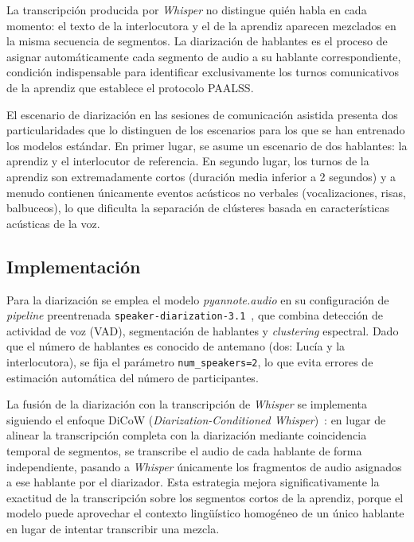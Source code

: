La transcripción producida por \emph{Whisper} no distingue quién habla en cada
momento: el texto de la interlocutora y el de la aprendiz aparecen mezclados en la
misma secuencia de segmentos. La diarización de hablantes es el proceso de asignar
automáticamente cada segmento de audio a su hablante correspondiente, condición
indispensable para identificar exclusivamente los turnos comunicativos de la aprendiz
que establece el protocolo \ac{PAALSS}.

El escenario de diarización en las sesiones de comunicación asistida presenta dos
particularidades que lo distinguen de los escenarios para los que se han entrenado los
modelos estándar. En primer lugar, se asume un escenario de dos hablantes: la aprendiz
y el interlocutor de referencia. En segundo lugar, los turnos de la aprendiz son
extremadamente cortos (duración media inferior a 2 segundos) y a menudo contienen
únicamente eventos acústicos no verbales (vocalizaciones, risas, balbuceos), lo que
dificulta la separación de clústeres basada en características acústicas de la voz.


\subsection{Implementación}
\label{subsec:diar_impl}

Para la diarización se emplea el modelo \emph{pyannote.audio} en su configuración de
\emph{pipeline} preentrenada \texttt{speaker-diarization-3.1}~\cite{pyannote_plaquet2023},
que combina detección de actividad de voz (\ac{VAD}), segmentación de hablantes y
\emph{clustering} espectral. Dado que el número de hablantes es conocido de antemano
(dos: Lucía y la interlocutora), se fija el parámetro \texttt{num\_speakers=2}, lo
que evita errores de estimación automática del número de participantes.

La fusión de la diarización con la transcripción de \emph{Whisper} se implementa
siguiendo el enfoque DiCoW (\emph{Diarization-Conditioned
Whisper})~\cite{dicow_diarization}: en lugar de alinear la transcripción completa con
la diarización mediante coincidencia temporal de segmentos, se transcribe el audio de
cada hablante de forma independiente, pasando a \emph{Whisper} únicamente los
fragmentos de audio asignados a ese hablante por el diarizador. Esta estrategia mejora
significativamente la exactitud de la transcripción sobre los segmentos cortos de la
aprendiz, porque el modelo puede aprovechar el contexto lingüístico homogéneo de un
único hablante en lugar de intentar transcribir una mezcla.

